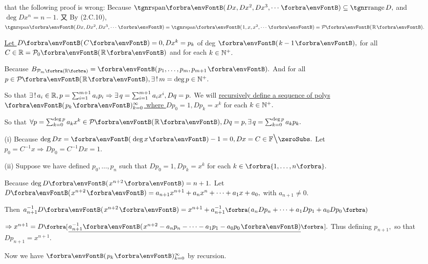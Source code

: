  \;\NOTICE that the following proof is wrong:\parSol{}
Because $\Span{Dx,Dx^2,Dx^3,\cdots}\subseteq\range D,$ and $\deg Dx^n=n-1.$\parSol{}
又 By (2.C.10), $\Span{Dx,Dx^2,Dx^3,\cdots}=\Span{1,x,x^2,\cdots}=\PoR{}.$\par\vspace{6pt}\quad
\uline{Let $D\Par{C}=0,Dx^k=p_k$} of deg $\Par{k-1},$ for all $C\in\Rbb=\PoR{0}$ and for each $k\in{\mathbb{N}^+}.$\par\quad
Because $B_{\PoR[\SmallPar]{m}}=\Par{p_1,\dots,p_m,p_{m+1}}.$ And for all $p\in\PoR{},\exists\,!\,m=\deg p\in\Nbp.$\par\quad
So that $\exists\,!\,a_i\in{\mathbb{R}},p=\sum_{i=1}^{m+1}a_ip_i\Rightarrow\exists\,q=\sum_{i=1}^{m+1}a_{i}x^{i},Dq=p.$\PfEnd\vspace{8pt}\quad
{\Or We will \uline{recursively define a sequence of polys $\Par{p_k}{_{k=0}^\infty}$ where $Dp_0=1,Dp_k=x^k$} for each $k\in{\mathbb{N}^+}.$}\par\vspace{2pt}\quad
{\normalsize\envFontSmall So that $\forall p=\sum_{k=0}^{\deg p}a_k x^k\in\PoR{},Dq=p,\exists\,q={\sum_{k=0}^{\deg p}a_k p_k}.$}\par\vspace{4pt}\quad
(i) {Because $\deg Dx=\Par{\deg x}-1=0,Dx=C\in\nonzeroFbb.$ Let $p_0=C^{-1}x\Rightarrow Dp_0=C^{-1}Dx=1.$}\vspace{2pt}\par\quad\Endi
(ii) {Suppose we have defined $p_0,\dots,p_n$ such that $Dp_0=1,Dp_k=x^k$ for each $k\in\Bra{1,\dots,n}.$}\vspace{2pt}\par\quad\Hii
{Because $\deg D\Par{x^{n+2}}=n+1.$ Let {\;$D\Par{x^{n+2}}=a_{n+1}x^{n+1}+a_n x^n+\dots+a_1 x+a_0,$} with $a_{n+1}\neq 0.$}\vspace{2pt}\par\quad\Hii
{Then {\;$a_{n+1}^{-1}D\Par{x^{n+2}}=x^{n+1}+a_{n+1}^{-1}\BigPar{a_n Dp_n+\dots+a_1 Dp_1 +a_0 Dp_0}$}}\vspace{2pt}\par\quad\Hii
{$\Rightarrow x^{n+1}=D\Sbra{\uline{a_{n+1}^{-1}\Par{x^{n+2}-a_n p_n-\dots-a_1 p_1-a_0 p_0}}}.$ Thus defining $p_{n+1},$ so that $Dp_{n+1}=x^{n+1}.$}\par\vspace{4pt}\quad
{Now we have $\Par{p_k}{_{k=0}^\infty}$ by recursion.}\PfEnd
\SepLine
\ChEnd

